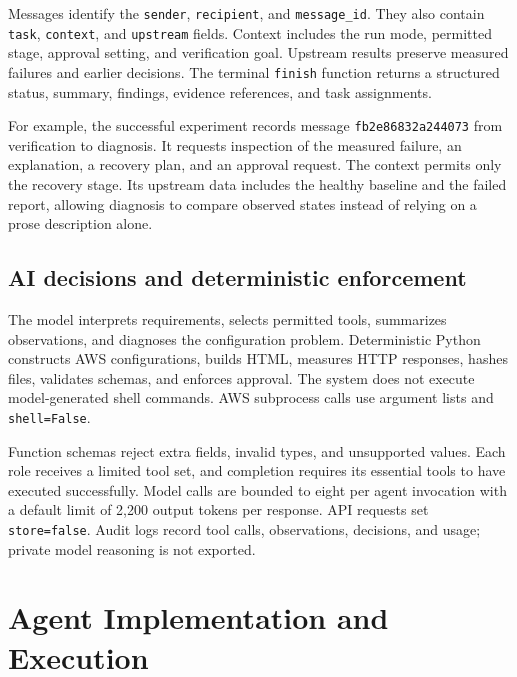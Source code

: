 \documentclass[11pt]{article}
\begin{document}
Messages identify the \texttt{sender}, \texttt{recipient}, and \texttt{message\_id}. They also contain \texttt{task}, \texttt{context}, and \texttt{upstream} fields. Context includes the run mode, permitted stage, approval setting, and verification goal. Upstream results preserve measured failures and earlier decisions. The terminal \texttt{finish} function returns a structured status, summary, findings, evidence references, and task assignments.

For example, the successful experiment records message \texttt{fb2e86832a244073} from verification to diagnosis. It requests inspection of the measured failure, an explanation, a recovery plan, and an approval request. The context permits only the recovery stage. Its upstream data includes the healthy baseline and the failed report, allowing diagnosis to compare observed states instead of relying on a prose description alone.

\subsection{AI decisions and deterministic enforcement}
The model interprets requirements, selects permitted tools, summarizes observations, and diagnoses the configuration problem. Deterministic Python constructs AWS configurations, builds HTML, measures HTTP responses, hashes files, validates schemas, and enforces approval. The system does not execute model-generated shell commands. AWS subprocess calls use argument lists and \texttt{shell=False}.

Function schemas reject extra fields, invalid types, and unsupported values. Each role receives a limited tool set, and completion requires its essential tools to have executed successfully. Model calls are bounded to eight per agent invocation with a default limit of 2,200 output tokens per response. API requests set \texttt{store=false}. Audit logs record tool calls, observations, decisions, and usage; private model reasoning is not exported.

\section{Agent Implementation and Execution}
\end{document}
